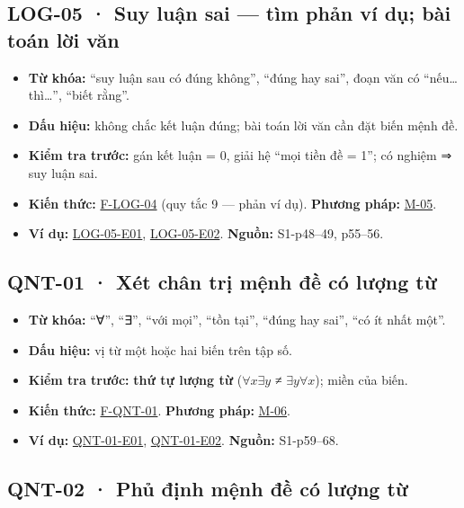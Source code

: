 \documentclass[
  10pt,
  twoside,openany]{book}
\providecommand{\tightlist}{%
  \setlength{\itemsep}{0pt}\setlength{\parskip}{0pt}}
\begin{document}
\hypertarget{LOG-05}{%
\subsection{LOG-05 · Suy luận sai --- tìm phản ví dụ; bài toán lời
văn}\label{LOG-05}}

\begin{itemize}
\tightlist
\item
  \textbf{Từ khóa:} ``suy luận sau có đúng không'', ``đúng hay sai'',
  đoạn văn có ``nếu\ldots{} thì\ldots{}'', ``biết rằng''.
\item
  \textbf{Dấu hiệu:} không chắc kết luận đúng; bài toán lời văn cần đặt
  biến mệnh đề.
\item
  \textbf{Kiểm tra trước:} gán kết luận = 0, giải hệ ``mọi tiền đề =
  1''; có nghiệm ⇒ suy luận sai.
\item
  \textbf{Kiến thức:} \protect\hyperlink{F-LOG-04}{F-LOG-04} (quy tắc 9
  --- phản ví dụ). \textbf{Phương pháp:} \protect\hyperlink{M-05}{M-05}.
\item
  \textbf{Ví dụ:} \protect\hyperlink{LOG-05-E01}{LOG-05-E01},
  \protect\hyperlink{LOG-05-E02}{LOG-05-E02}. \textbf{Nguồn:}
  S1-p48--49, p55--56.
\end{itemize}

\hypertarget{QNT-01}{%
\subsection{QNT-01 · Xét chân trị mệnh đề có lượng từ}\label{QNT-01}}

\begin{itemize}
\tightlist
\item
  \textbf{Từ khóa:} ``∀'', ``∃'', ``với mọi'', ``tồn tại'', ``đúng hay
  sai'', ``có ít nhất một''.
\item
  \textbf{Dấu hiệu:} vị từ một hoặc hai biến trên tập số.
\item
  \textbf{Kiểm tra trước:} \textbf{thứ tự lượng từ}
  (\(\forall x\exists y\) ≠ \(\exists y\forall x\)); miền của biến.
\item
  \textbf{Kiến thức:} \protect\hyperlink{F-QNT-01}{F-QNT-01}.
  \textbf{Phương pháp:} \protect\hyperlink{M-06}{M-06}.
\item
  \textbf{Ví dụ:} \protect\hyperlink{QNT-01-E01}{QNT-01-E01},
  \protect\hyperlink{QNT-01-E02}{QNT-01-E02}. \textbf{Nguồn:}
  S1-p59--68.
\end{itemize}

\hypertarget{QNT-02}{%
\subsection{QNT-02 · Phủ định mệnh đề có lượng từ}\label{QNT-02}}
\end{document}
